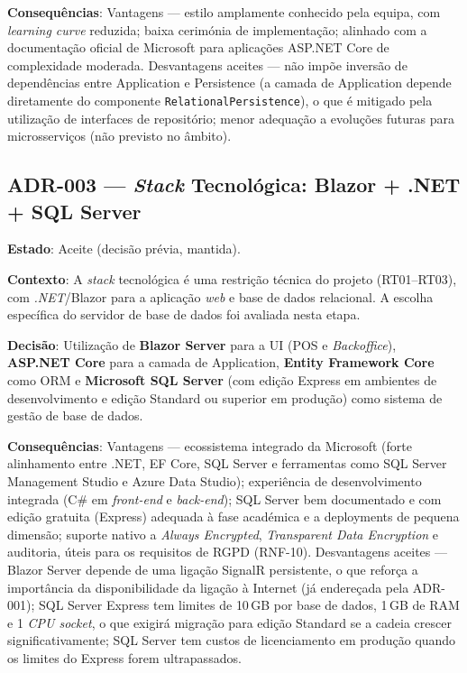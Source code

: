 \noindent\textbf{Consequências}: Vantagens --- estilo amplamente conhecido pela equipa, com \textit{learning curve} reduzida; baixa cerimónia de implementação; alinhado com a documentação oficial de Microsoft para aplicações ASP.NET Core de complexidade moderada. Desvantagens aceites --- não impõe inversão de dependências entre Application e Persistence (a camada de Application depende diretamente do componente \texttt{RelationalPersistence}), o que é mitigado pela utilização de interfaces de repositório; menor adequação a evoluções futuras para microsserviços (não previsto no âmbito).

\subsection*{ADR-003 --- \textit{Stack} Tecnológica: Blazor + .NET + SQL Server}

\noindent\textbf{Estado}: Aceite (decisão prévia, mantida).

\noindent\textbf{Contexto}: A \textit{stack} tecnológica é uma restrição técnica do projeto (RT01--RT03), com \textit{.NET}/Blazor para a aplicação \textit{web} e base de dados relacional. A escolha específica do servidor de base de dados foi avaliada nesta etapa.

\noindent\textbf{Decisão}: Utilização de \textbf{Blazor Server} para a UI (POS e \textit{Backoffice}), \textbf{ASP.NET Core} para a camada de Application, \textbf{Entity Framework Core} como ORM e \textbf{Microsoft SQL Server} (com edição Express em ambientes de desenvolvimento e edição Standard ou superior em produção) como sistema de gestão de base de dados.

\noindent\textbf{Consequências}: Vantagens --- ecossistema integrado da Microsoft (forte alinhamento entre .NET, EF Core, SQL Server e ferramentas como SQL Server Management Studio e Azure Data Studio); experiência de desenvolvimento integrada (C\# em \textit{front-end} e \textit{back-end}); SQL Server bem documentado e com edição gratuita (Express) adequada à fase académica e a deployments de pequena dimensão; suporte nativo a \textit{Always Encrypted}, \textit{Transparent Data Encryption} e auditoria, úteis para os requisitos de RGPD (RNF-10). Desvantagens aceites --- Blazor Server depende de uma ligação SignalR persistente, o que reforça a importância da disponibilidade da ligação à Internet (já endereçada pela ADR-001); SQL Server Express tem limites de 10\,GB por base de dados, 1\,GB de RAM e 1 \textit{CPU socket}, o que exigirá migração para edição Standard se a cadeia crescer significativamente; SQL Server tem custos de licenciamento em produção quando os limites do Express forem ultrapassados.

